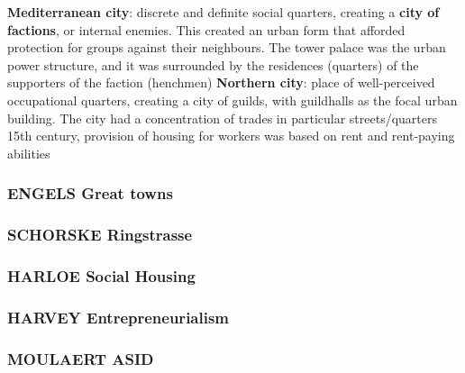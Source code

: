 \documentclass{article}
\begin{document}
\begin{outline}
		\2 \textbf{Mediterranean city}: discrete and definite social quarters, creating a \textbf{city of factions}, or internal enemies. This created an urban form that afforded protection for groups against their neighbours. The tower palace was the urban power structure, and it was surrounded by the residences (quarters) of the supporters of the faction (henchmen)
		\2 \textbf{Northern city}: place of well-perceived occupational quarters, creating a city of guilds, with guildhalls as the focal urban building. The city had a concentration of trades in particular streets/quarters
	\1 15th century, provision of housing for workers was based on rent and rent-paying abilities
\end{outline}


\subsubsection{ENGELS Great towns}

\subsubsection{SCHORSKE Ringstrasse}

\subsubsection{HARLOE Social Housing}

\subsubsection{HARVEY Entrepreneurialism}

\subsubsection{MOULAERT ASID}



\begin{comment}
\begin{chronology}[10]{1900}{2010}{100ex}[\textwidth]
\event{1930}{Bismarckian (pioneers)}
\event{1960}{Beveridgian (divergence)}
\event{1997}{Convergence}
\end{chronology}
\end{comment}

\printbibliography
\end{document}

